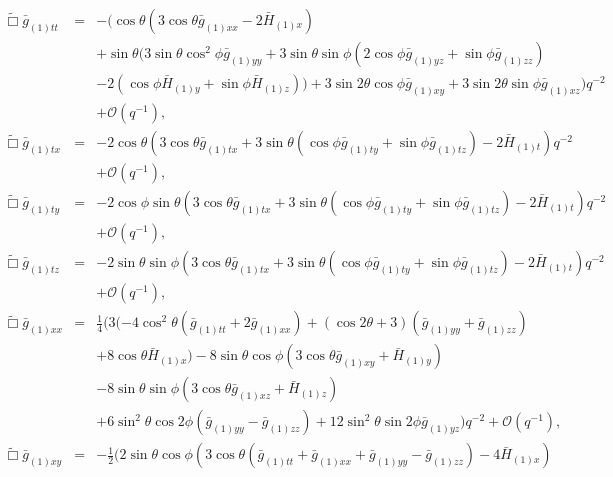 \documentclass[a4paper,11pt]{article}
\numberwithin{equation}{section}
\begin{document}
\begin{eqnarray}\label{eqn:efett}
\tilde{\Box}\bar{g}_{(1)tt}&=&-(\cos \theta (3 \cos \theta  \bar{g}_{(1)xx}-2 \bar{H}_{(1)x}) \nonumber \\
&&+\sin\theta (3 \sin \theta \cos^2\phi \bar{g}_{(1) yy}+3
   \sin \theta  \sin \phi (2 \cos \phi  \bar{g}_{(1) yz}+\sin\phi
   \bar{g}_{(1) zz}) \nonumber \\
   &&-2 (\cos \phi \bar{H}_{(1) y}+\sin\phi
   \bar{H}_{(1) z}))+3 \sin 2 \theta  \cos \phi \bar{g}_{(1) xy}+3
   \sin 2 \theta  \sin \phi \bar{g}_{(1) xz})q^{-2} \nonumber \\
&&+\mathcal{O}(q^{-1}),\\
%
\label{eqn:efetx}
\tilde{\Box}\bar{g}_{(1)tx}&=&-2 \cos \theta (3 \cos\theta \bar{g}_{(1) tx}+3 \sin \theta
   (\cos \phi  \bar{g}_{(1) ty}+\sin \phi  \bar{g}_{(1)tz})-2
   \bar{H}_{(1) t})    q^{-2} \nonumber \\
&&+\mathcal{O}(q^{-1}),\\
%
\label{eqn:efety}
\tilde{\Box}\bar{g}_{(1)ty}&=&-2 \cos \phi \sin\theta (3 \cos\theta \bar{g}_{(1) tx}+3 \sin \theta
   (\cos \phi  \bar{g}_{(1) ty}+\sin \phi  \bar{g}_{(1)tz})-2
   \bar{H}_{(1) t})    q^{-2} \nonumber \\
&&+\mathcal{O}(q^{-1}),\\
%
\label{eqn:efetz}
\tilde{\Box}\bar{g}_{(1)tz}&=&-2 \sin \theta \sin\phi (3 \cos\theta \bar{g}_{(1) tx}+3 \sin \theta
   (\cos \phi \bar{g}_{(1) ty}+\sin \phi  \bar{g}_{(1)tz})-2
   \bar{H}_{(1) t})    q^{-2} \nonumber \\
&&+\mathcal{O}(q^{-1}),\\
%
\label{eqn:efexx}
\tilde{\Box}\bar{g}_{(1)xx}&=&\frac{1}{4} (3 (-4 \cos ^2\theta (\bar{g}_{(1) tt}+2 \bar{g}_{(1)
   xx})+(\cos 2 \theta +3) (\bar{g}_{(1) yy}+\bar{g}_{(1)
zz}) \nonumber \\
&&+8 \cos \theta  \bar{H}_{(1) x})-8 \sin \theta  \cos \phi 
   (3 \cos \theta  \bar{g}_{(1)xy}+\bar{H}_{(1) y}) \nonumber \\
   &&-8 \sin\theta \sin\phi (3 \cos\theta \bar{g}_{(1) xz}+\bar{H}_{(1) z}) \nonumber \\
   &&+6 \sin^2\theta  \cos 2 \phi  (\bar{g}_{(1)yy}-\bar{g}_{(1)zz})+12
   \sin^2\theta  \sin 2 \phi  \bar{g}_{(1) yz})    q^{-2} +\mathcal{O}(q^{-1}),\\
%
\label{eqn:efexy}
\tilde{\Box}\bar{g}_{(1)xy}&=&-\frac{1}{2} (2 \sin \theta  \cos \phi  (3 \cos \theta (\bar{g}_{(1)tt}+\bar{g}_{(1)xx}+\bar{g}_{(1)yy}-\bar{g}_{(1)zz})-4 \bar{H}_{(1) x}) \nonumber \\

\end{eqnarray}
\end{document}
